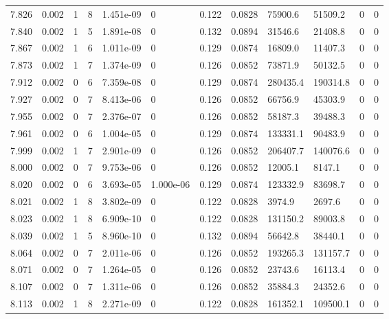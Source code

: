 \documentclass[preview]{standalone}
\begin{document}
{{{{{{{{{\begin{tabular}{L{1.2cm}C{1.2cm} C{0.3cm}C{0.5cm} C{1.4cm}C{1.4cm} C{1.4cm}C{1.4cm} C{1.6cm}C{1.6cm} C{1.6cm}C{1.6cm}}
  7.826  &  0.002  & 1     &  8 &  1.451e-09  & 0  &  0.122&   0.0828& 75900.6 & 51509.2   &  0 & 0  \\ 
  7.840  &  0.002  & 1     &  5 &  1.891e-08  & 0  &  0.132&   0.0894& 31546.6 & 21408.8   &  0 & 0  \\ 
  7.867  &  0.002  & 1     &  6 &  1.011e-09  & 0  &  0.129&   0.0874& 16809.0 & 11407.3   &  0 & 0  \\ 
  7.873  &  0.002  & 1     &  7 &  1.374e-09  & 0  &  0.126&   0.0852& 73871.9 & 50132.5   &  0 & 0  \\ 
  7.912  &  0.002  & 0     &  6 &  7.359e-08  & 0  &  0.129&   0.0874& 280435.4 & 190314.8   &  0 & 0  \\ 
  7.927  &  0.002  & 0     &  7 &  8.413e-06  & 0  &  0.126&   0.0852& 66756.9 & 45303.9   &  0 & 0  \\ 
  7.955  &  0.002  & 0     &  7 &  2.376e-07  & 0  &  0.126&   0.0852& 58187.3 & 39488.3   &  0 & 0  \\ 
  7.961  &  0.002  & 0     &  6 &  1.004e-05  & 0  &  0.129&   0.0874& 133331.1 & 90483.9   &  0 & 0  \\ 
  7.999  &  0.002  & 1     &  7 &  2.901e-09  & 0  &  0.126&   0.0852& 206407.7 & 140076.6   &  0 & 0  \\ 
  8.000  &  0.002  & 0     &  7 &  9.753e-06  & 0  &  0.126&   0.0852& 12005.1 & 8147.1   &  0 & 0  \\ 
  8.020  &  0.002  & 0     &  6 &  3.693e-05  & 1.000e-06  &  0.129&   0.0874& 123332.9 & 83698.7   &  0 & 0  \\ 
  8.021  &  0.002  & 1     &  8 &  3.802e-09  & 0  &  0.122&   0.0828& 3974.9 & 2697.6   &  0 & 0  \\ 
  8.023  &  0.002  & 1     &  8 &  6.909e-10  & 0  &  0.122&   0.0828& 131150.2 & 89003.8   &  0 & 0  \\ 
  8.039  &  0.002  & 1     &  5 &  8.960e-10  & 0  &  0.132&   0.0894& 56642.8 & 38440.1   &  0 & 0  \\ 
  8.064  &  0.002  & 0     &  7 &  2.011e-06  & 0  &  0.126&   0.0852& 193265.3 & 131157.7   &  0 & 0  \\ 
  8.071  &  0.002  & 0     &  7 &  1.264e-05  & 0  &  0.126&   0.0852& 23743.6 & 16113.4   &  0 & 0  \\ 
  8.107  &  0.002  & 0     &  7 &  1.311e-06  & 0  &  0.126&   0.0852& 35884.3 & 24352.6   &  0 & 0  \\ 
  8.113  &  0.002  & 1     &  8 &  2.271e-09  & 0  &  0.122&   0.0828& 161352.1 & 109500.1   &  0 & 0  \\ 

\end{tabular}}}}}}}}}}
\end{document}
